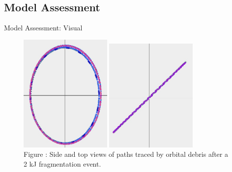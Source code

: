 \documentclass{beamer}
\begin{document}
\subsection{Model Assessment}


\begin{frame}{Model Assessment: Visual}
\begin{figure}
\begin{center}
\label{fig:sat_orbit_explosion}
\includegraphics[width=0.4\textwidth]{depth.jpg}
\includegraphics[width=0.4\textwidth]{top.jpg}\\
Figure : Side and top views of paths traced by orbital debris after a 2 kJ fragmentation event.
\end{center}
\end{figure}
\end{frame}
\end{document}
